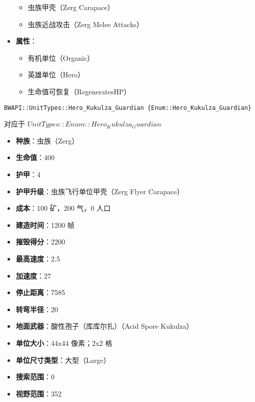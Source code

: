 \begin{tcolorbox}[colback=white, colframe=black!60!white, title=Hero\_Infested\_Kerrigan(), arc=0mm]
\begin{itemize}
\begin{itemize}
                \item 虫族甲壳（Zerg Carapace）
                \item 虫族近战攻击（Zerg Melee Attacks）
            \end{itemize}
        \item \textbf{属性}：
            \begin{itemize}
                \item 有机单位（Organic）
                \item 英雄单位（Hero）
                \item 生命值可恢复（RegeneratesHP）
            \end{itemize}
    \end{itemize}
\end{tcolorbox}

\begin{tcolorbox}[colback=white, colframe=black!60!white, title=Hero\_Kukulza\_Guardian(), arc=0mm]
    \begin{verbatim}
BWAPI::UnitTypes::Hero_Kukulza_Guardian {Enum::Hero_Kukulza_Guardian}
    \end{verbatim}
    对应于  $ UnitTypes::Enum::Hero_Kukulza_Guardian $ 
    \begin{itemize}
        \item \textbf{种族}：虫族（Zerg）
        \item \textbf{生命值}：400
        \item \textbf{护甲}：4
        \item \textbf{护甲升级}：虫族飞行单位甲壳（Zerg Flyer Carapace）
        \item \textbf{成本}：100 矿，200 气，0 人口
        \item \textbf{建造时间}：1200 帧
        \item \textbf{摧毁得分}：2200
        \item \textbf{最高速度}：2.5
        \item \textbf{加速度}：27
        \item \textbf{停止距离}：7585
        \item \textbf{转弯半径}：20
        \item \textbf{地面武器}：酸性孢子（库库尔扎）（Acid Spore Kukulza）
        \item \textbf{单位大小}：44x44 像素；2x2 格
        \item \textbf{单位尺寸类型}：大型（Large）
        \item \textbf{搜索范围}：0
        \item \textbf{视野范围}：352

\end{itemize}
\end{tcolorbox}
